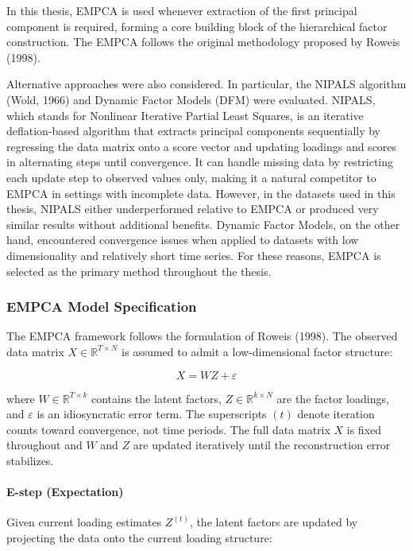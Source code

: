 \documentclass[12pt,a4paper]{report}
\begin{document}
In this thesis, EMPCA is used whenever extraction of the first principal component is required, forming a core building block of the hierarchical factor construction. The EMPCA follows the original methodology proposed by Roweis (1998).

Alternative approaches were also considered. In particular, the NIPALS algorithm (Wold, 1966) and Dynamic Factor Models (DFM) were evaluated. NIPALS, which stands for Nonlinear Iterative Partial Least Squares, is an iterative deflation-based algorithm that extracts principal components sequentially by regressing the data matrix onto a score vector and updating loadings and scores in alternating steps until convergence. It can handle missing data by restricting each update step to observed values only, making it a natural competitor to EMPCA in settings with incomplete data. However, in the datasets used in this thesis, NIPALS either underperformed relative to EMPCA or produced very similar results without additional benefits. Dynamic Factor Models, on the other hand, encountered convergence issues when applied to datasets with low dimensionality and relatively short time series. For these reasons, EMPCA is selected as the primary method throughout the thesis.


\subsubsection*{EMPCA Model Specification}

The EMPCA framework follows the formulation of Roweis (1998). The observed 
data matrix $X \in \mathbb{R}^{T \times N}$ is assumed to admit a 
low-dimensional factor structure:

\begin{equation}
X = WZ + \varepsilon
\end{equation}

where $W \in \mathbb{R}^{T \times k}$ contains the latent factors, 
$Z \in \mathbb{R}^{k \times N}$ are the factor loadings, and $\varepsilon$ 
is an idiosyncratic error term. The superscripts $(t)$ denote iteration 
counts toward convergence, not time periods. The full data matrix $X$ is 
fixed throughout and $W$ and $Z$ are updated iteratively until the 
reconstruction error stabilizes.

\paragraph{E-step (Expectation)}
Given current loading estimates $Z^{(t)}$, the latent factors are updated by 
projecting the data onto the current loading structure:
\end{document}
